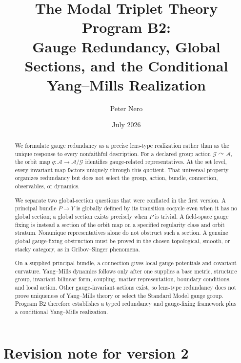 \documentclass[11pt]{article}
\title{The Modal Triplet Theory Program B2:\\
Gauge Redundancy, Global Sections, and the Conditional Yang--Mills Realization}
\author{Peter Nero}
\date{July 2026}
\newcommand{\Conn}{\mathcal A}
\newcommand{\Gg}{\mathcal G}
\begin{document}
\maketitle

\begin{abstract}
We formulate gauge redundancy as a precise lens-type realization rather than
as the unique response to every nonfaithful description.  For a declared group
action $\Gg\curvearrowright\Conn$, the orbit map
$q:\Conn\to\Conn/\Gg$ identifies gauge-related representatives.  At the
set level, every invariant map factors uniquely through this quotient.  That
universal property organizes redundancy but does not select the group, action,
bundle, connection, observables, or dynamics.

We separate two global-section questions that were conflated in the first
version.  A principal bundle $P\to Y$ is globally defined by its transition
cocycle even when it has no global section; a global section exists precisely
when $P$ is trivial.  A field-space gauge fixing is instead a section of the
orbit map on a specified regularity class and orbit stratum.  Nonunique
representatives alone do not obstruct such a section.  A genuine global
gauge-fixing obstruction must be proved in the chosen topological, smooth, or
stacky category, as in Gribov--Singer phenomena.

On a supplied principal bundle, a connection gives local gauge potentials and
covariant curvature.  Yang--Mills dynamics follows only after one supplies a
base metric, structure group, invariant bilinear form, coupling, matter
representation, boundary conditions, and local action.  Other gauge-invariant
actions exist, so lens-type redundancy does not prove uniqueness of
Yang--Mills theory or select the Standard Model gauge group.  Program B2
therefore establishes a typed redundancy and gauge-fixing framework plus a
conditional Yang--Mills realization.
\end{abstract}

\section*{Revision note for version 2}
\end{document}
